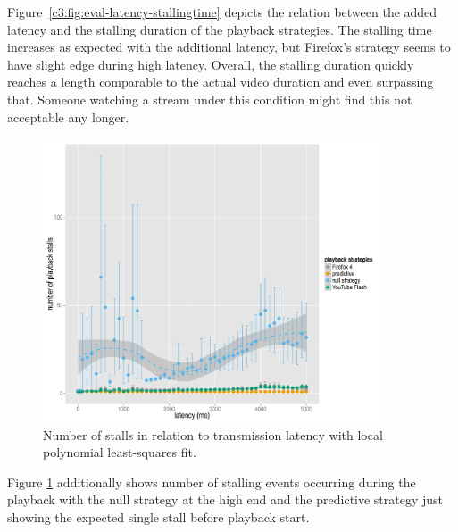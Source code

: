 Figure~\ref{c3:fig:eval-latency-stallingtime} depicts the relation between the added latency and the stalling duration of the playback strategies. The stalling time increases as expected with the additional latency, but Firefox's strategy seems to have slight edge during high latency. Overall, the stalling duration quickly reaches a length comparable to the actual video duration and even surpassing that. Someone watching a stream under this condition might find this not acceptable any longer.


\begin{figure}[htb]
    \centering
    \includegraphics[width=0.9\textwidth]{images/R-playbackemulation-stallnumber-latency.pdf}
    \caption{Number of stalls in relation to transmission latency with local polynomial least-squares fit.}
    \label{c3:fig:eval-latency-numstalls}
\end{figure}

Figure \ref{c3:fig:eval-latency-numstalls} additionally shows number of stalling events occurring during the playback with the null strategy at the high end and the predictive strategy just showing the expected single stall before playback start. %

